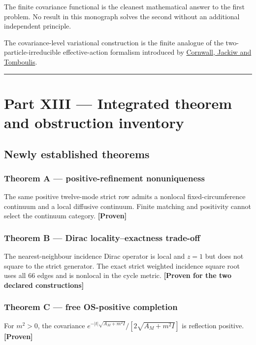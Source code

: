 \documentclass[11pt,a4paper,openany]{report}
\newcommand{\statusProven}{\textcolor{fingreen}{[Proven]}}
\begin{document}
The finite covariance functional is the cleanest mathematical answer to the first problem. No result in this monograph solves the second without an additional independent principle.

The covariance-level variational construction is the finite analogue of the two-particle-irreducible effective-action formalism introduced by \href{https://doi.org/10.1103/PhysRevD.10.2428}{Cornwall, Jackiw and Tomboulis}.

\par\medskip\hrule\medskip

\chapter{Part XIII — Integrated theorem and obstruction inventory}

\section{Newly established theorems}

\subsection{Theorem A — positive-refinement nonuniqueness}

The same positive twelve-mode strict row admits a nonlocal fixed-circumference continuum and a local diffusive continuum. Finite matching and positivity cannot select the continuum category. \textbf{\statusProven{}}

\subsection{Theorem B — Dirac locality–exactness trade-off}

The nearest-neighbour incidence Dirac operator is local and \(z=1\) but does not square to the strict generator. The exact strict weighted incidence square root uses all 66 edges and is nonlocal in the cycle metric. \textbf{[Proven for the two declared constructions]}

\subsection{Theorem C — free OS-positive completion}

For \(m^2>0\), the covariance \(e^{-|t|\sqrt{A_M+m^2I}}/[2\sqrt{A_M+m^2I}]\) is reflection positive. \textbf{\statusProven{}}
\end{document}
